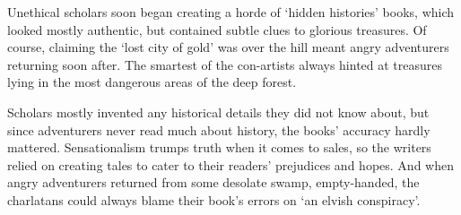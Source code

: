 \begin{multicols}{2}
\begin{exampletext}
    Unethical scholars soon began creating a horde of `hidden histories' books, which looked mostly authentic, but contained subtle clues to glorious treasures.
    Of course, claiming the `lost city of gold' was over the hill meant angry adventurers returning soon after.
    The smartest of the con-artists always hinted at treasures lying in the most dangerous areas of the deep forest.

    Scholars mostly invented any historical details they did not know about, but since adventurers never read much about history, the books' accuracy hardly mattered.
    Sensationalism trumps truth when it comes to sales, so the writers relied on creating tales to cater to their readers' prejudices and hopes.
    And when angry adventurers returned from some desolate swamp, empty-handed, the charlatans could always blame their book's errors on `an elvish conspiracy'.
  \fi

\end{exampletext}

\end{multicols}
